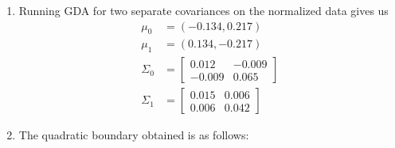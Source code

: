 \documentclass[12pt]{article}
\begin{document}
\begin{enumerate}
    \item Running GDA for two separate covariances on the normalized data gives us 
    \begin{align*}
        \mu_0 &= (-0.134,0.217) \\
        \mu_1 &= (0.134,-0.217) \\
        \Sigma_0 &= 
        \begin{bmatrix}
            0.012 & -0.009 \\
            -0.009 & 0.065
        \end{bmatrix} \\
        \Sigma_1 &= 
        \begin{bmatrix}
            0.015 & 0.006 \\
            0.006 & 0.042
        \end{bmatrix}
    \end{align*}

    \item The quadratic boundary obtained is as follows: 

    \begin{center}\end{center}

\end{enumerate}
\end{document}
